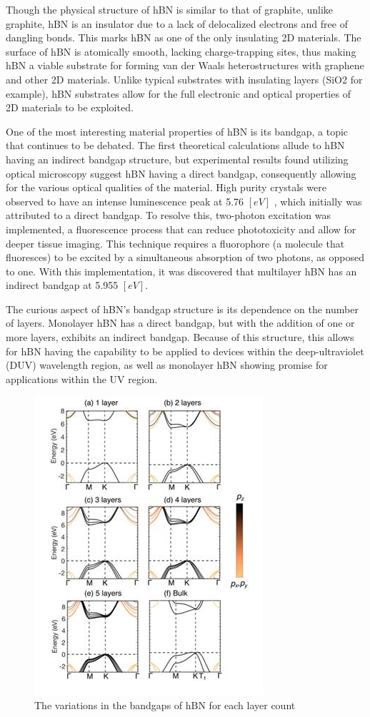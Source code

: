 \documentclass[conference]{IEEEtran}
\begin{document}
Though the physical structure of hBN is similar to that of graphite, unlike graphite, hBN is an insulator due to a lack of delocalized electrons and \cite{b9} free of dangling bonds. This marks hBN as one of the only insulating 2D materials. The surface of hBN is atomically smooth, lacking charge-trapping sites, thus making hBN a viable substrate for forming van der Waals heterostructures with graphene and other 2D materials. Unlike typical substrates with insulating layers (SiO2 for example), hBN substrates allow for the full electronic and optical properties of 2D materials to be exploited. \cite{b10}

One of the most interesting material properties of hBN is its bandgap, a topic that continues to be debated. The first theoretical calculations allude to hBN having an indirect bandgap structure, but experimental results found utilizing optical microscopy suggest hBN having a direct bandgap, consequently allowing for the various optical qualities of the material. High purity crystals were observed to have an intense luminescence peak at 5.76 $[\si{eV}]$ \cite{b9}, which initially was attributed to a direct bandgap. To resolve this, two-photon excitation was implemented, a fluorescence process that can reduce phototoxicity and allow for deeper tissue imaging. This technique requires a fluorophore (a molecule that fluoresces) to be excited by a simultaneous absorption of two photons, as opposed to one. With this implementation, it was discovered that multilayer hBN has an indirect bandgap at 5.955 $[\si{eV}]$.

The curious aspect of hBN’s bandgap structure is its dependence on the number of layers. Monolayer hBN has a direct bandgap, but with the addition of one or more layers, exhibits an indirect bandgap. Because of this structure, this allows for hBN having the capability to be applied to devices within the deep-ultraviolet (DUV) wavelength region, as well as monolayer hBN showing promise for applications within the UV region.

\begin{figure}[h]
  \centering
  \includegraphics[width=.45\textwidth]{Figures/hBN-Layers}
  \caption{The variations in the bandgaps of hBN for each layer count}
  \label{fig:1}
\end{figure}
 
\end{document}
